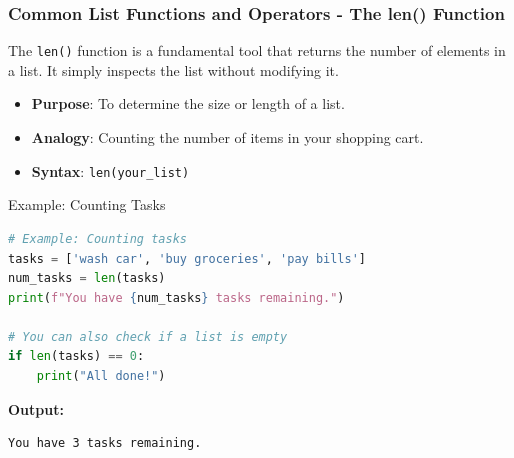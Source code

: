 \documentclass{beamer}
\begin{document}
\begin{frame}[fragile]
    \frametitle{Common List Functions and Operators - The len() Function}
    
    The \texttt{len()} function is a fundamental tool that returns the number of elements in a list. It simply inspects the list without modifying it.
    
    \begin{itemize}
        \item \textbf{Purpose}: To determine the size or length of a list.
        \item \textbf{Analogy}: Counting the number of items in your shopping cart.
        \item \textbf{Syntax}: \texttt{len(your\_list)}
    \end{itemize}
    
    \begin{block}{Example: Counting Tasks}
\begin{lstlisting}[language=Python]
# Example: Counting tasks
tasks = ['wash car', 'buy groceries', 'pay bills']
num_tasks = len(tasks)
print(f"You have {num_tasks} tasks remaining.")

# You can also check if a list is empty
if len(tasks) == 0:
    print("All done!")
\end{lstlisting}
    \vspace{2mm}
    \textbf{Output:}
\begin{verbatim}
You have 3 tasks remaining.
\end{verbatim}
    \end{block}
    
\end{frame}
\end{document}
